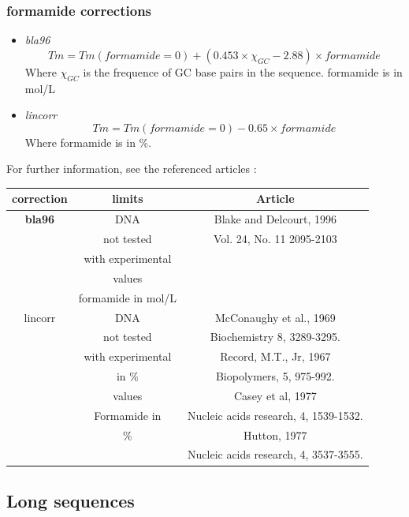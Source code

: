 \documentclass{article}
\begin{document}
\pagebreak
\subsubsection{formamide corrections}
  \begin{itemize}
  \item \textit{bla96}
  \begin{displaymath}
  Tm=Tm(formamide=0)+ (0.453 \times \chi_{GC} - 2.88) \times formamide
  \end{displaymath}
  Where $\chi_{GC}$ is the frequence of GC base pairs in the sequence.
  formamide is in mol/L
  \item \textit{lincorr}
  \begin{displaymath}
  Tm=Tm(formamide=0)-0.65 \times formamide
  \end{displaymath}
  Where formamide is in \%.
  \end{itemize}

For further information, see the referenced articles :
\begin{table}[hc]
\begin{tabular}[h]{| c | c | c |}
\textbf{correction} & \textbf{limits} & \textbf{Article} \\
\hline 
\textbf{bla96} & DNA & Blake and Delcourt, 1996 \\
 & not tested & Vol. 24, No. 11 2095-2103 \\
 & with experimental & \\
 & values & \\
 & formamide in mol/L& \\
 \hline
lincorr & DNA & McConaughy et al., 1969 \\
 & not tested & Biochemistry 8, 3289-3295. \\
 & with experimental & Record, M.T., Jr, 1967 \\
 & in \% & Biopolymers, 5, 975-992. \\
 & values & Casey et al, 1977 \\
 & Formamide in & Nucleic acids research, 4, 1539-1532. \\
 & \% & Hutton, 1977 \\
 & & Nucleic acids research, 4, 3537-3555. \\
 \hline
\end{tabular}
\end{table}

\pagebreak
\subsection{Long sequences } 
 
\end{document}

